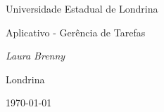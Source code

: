 \begin{titlepage}
  \centering
  \vspace*{2cm}
  {\Large Universidade Estadual de Londrina \par}
  \vspace{3cm}
  {\Huge Aplicativo - Gerência de Tarefas\par}
  \vspace{2cm}
  {\Large\itshape Laura Brenny \par}
  \vfill
  {\large Londrina \par}
  {\Large \today \par}
\end{titlepage}
